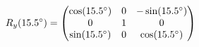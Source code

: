 \documentclass[preview]{standalone}
\begin{document}
\begin{align*}
\special{dvisvgm:raw <g id='unique000'>}R_y(15.5^\circ) = \begin{pmatrix} \cos(15.5^\circ) & 0 & -\sin(15.5^\circ) \\ 0 & 1 & 0 \\ \sin(15.5^\circ) & 0 & \cos(15.5^\circ) \end{pmatrix}\special{dvisvgm:raw </g>}
\end{align*}
\end{document}

